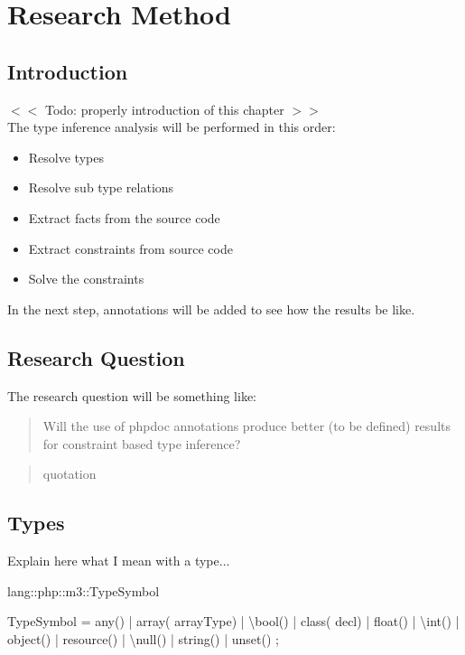 \documentclass[../main.tex]{subfiles}
\begin{document}
    \chapter{Research Method}\label{chap:research_method}


    \section{Introduction}
    $<<$ Todo: properly introduction of this chapter $>>$
    \\
    The type inference analysis will be performed in this order:
    \begin{itemize}
        \item Resolve types
        \item Resolve sub type relations
        \item Extract facts from the source code
        \item Extract constraints from source code
        \item Solve the constraints
    \end{itemize}
    In the next step, annotations will be added to see how the results be like.
    
    \section{Research Question}
    The research question will be something like: \\
    \begin{quote}
        Will the use of phpdoc annotations produce better (to be defined) results for constraint based type inference?
    \end{quote}

    \begin{quotation}
    quotation
    \end{quotation}



    \section{Types}
    Explain here what I mean with a type...
    
    \begin{rascal}
 lang::php::m3::TypeSymbol

 TypeSymbol
  = any()
  | array( arrayType)
  | \textbackslash{}bool()
  | class( decl)
  | float()
  | \textbackslash{}int()
  | object()
  | resource()
  | \textbackslash{}null()
  | string()
  | unset()
  ; 
    \end{rascal}
    
\end{document}
